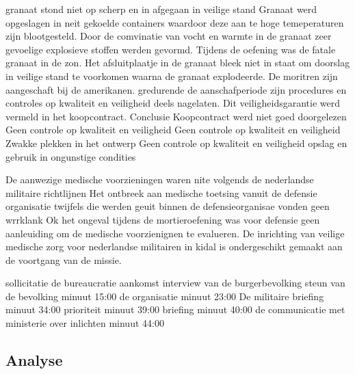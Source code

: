 granaat stond niet op scherp en in afgegaan in veilige stand
Granaat werd opgeslagen in neit gekoelde containers waardoor deze aan te hoge temeperaturen zijn blootgesteld.
Door de comvinatie van vocht en warmte in de granaat zeer gevoelige explosieve stoffen werden gevormd.
Tijdens de oefening was de fatale granaat in de zon.
Het afsluitplaatje in de granaat bleek niet in staat om doorslag in veilige stand te voorkomen waarna de granaat explodeerde.
De moritren zijn aangeschaft bij de amerikanen. gredurende de aanschafperiode zijn procedures en controles op kwaliteit en veiligheid deels nagelaten.
Dit veiligheidsgarantie werd vermeld in het koopcontract.
Conclusie
Koopcontract werd niet goed doorgelezen
Geen controle op kwaliteit en veiligheid
Geen controle op kwaliteit en veiligheid
Zwakke plekken in het ontwerp
Geen controle op kwaliteit en veiligheid
opslag en gebruik in ongunstige condities

De aanwezige medische voorzieningen waren nite volgends de nederlandse militaire richtlijnen
Het ontbreek aan medische toetsing vanuit de defensie organisatie
twijfels die werden geuit binnen de defensieorganisae vonden geen wrrklank
Ok het ongeval tijdens de mortieroefening was voor defensie geen aanleuiding om de medische voorzienignen te evalueren.
De inrichting van veilige medische zorg voor nederlandse militairen in kidal is ondergeschikt gemaakt aan de voortgang van de missie.


\cite{ovvMortierOngevalMaliVideo} 


\cite{bnnvara13062018malirapport}
\cite{eucal11012021malimissieverlengd}
\cite{nos21052014zorgenmalimissie}
\cite{meijnders}
\cite{bnrwebredactie}
\cite{keultjes01062016malimissiecoalitie}
\cite{veenhof18012019}

\cite{isitman06012016militair}
\cite{nporadio11072016filmdemissie}
\cite{parlementairmonitor15122013mortierongeluk}

sollicitatie
de bureaucratie
aankomst
interview van de burgerbevolking
steun van de bevolking minuut 15:00
de organisatie minuut 23:00
De militaire briefing minuut 34:00
prioriteit minuut 39:00
briefing minuut 40:00
de communicatie met ministerie over inlichten minuut 44:00

\cite{DemissieFilm}





\subsection{Analyse}


